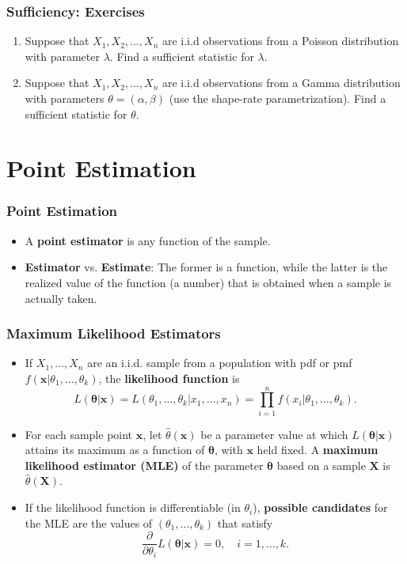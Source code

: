 \documentclass{beamer}
\begin{document}
\begin{frame}
\frametitle{Sufficiency: Exercises}
\begin{enumerate}
\item Suppose that $X_1,X_2,\ldots,X_n$ are i.i.d observations from a Poisson distribution with parameter $\lambda$. %
Find a sufficient statistic for $\lambda$.
\vspace*{0.7in}
\item Suppose that $X_1,X_2,\ldots,X_n$ are i.i.d observations from a Gamma distribution with parameters $\theta = (\alpha,\beta)$ (use the shape-rate parametrization). %
Find a sufficient statistic for $\theta$.
\end{enumerate}
\end{frame}

\section{Point Estimation}
\begin{frame}
\frametitle{Point Estimation}
\begin{itemize}
\item A \textbf{point estimator} is any function of the sample.
\item \textbf{Estimator} vs. \textbf{Estimate}: The former is a function, while the latter is the realized value of the function (a number) that is obtained when a sample is actually taken.
\end{itemize}
\end{frame}

\begin{frame}
\frametitle{Maximum Likelihood Estimators}
\begin{itemize}
\item If $X_1,\ldots,X_n$ are an i.i.d. sample from a population with pdf or pmf $f(\mathbf{x}|\theta_1,\ldots,\theta_k)$, the \textbf{likelihood function} is
$$
L(\mathbf{\theta}|\mathbf{x}) = L(\theta_1,\ldots,\theta_k|x_1,\ldots,x_n) = \prod_{i=1}^n f(x_i|\theta_1,\ldots,\theta_k).
$$
\item For each sample point $\mathbf{x}$, let $\hat{\theta}(\mathbf{x})$ be a parameter value at which $L(\mathbf{\theta}|\mathbf{x})$ attains its maximum as a function of $\mathbf{\theta}$, with $\mathbf{x}$ held fixed. A \textbf{maximum likelihood estimator (MLE)} of the parameter $\mathbf{\theta}$ based on a sample $\mathbf{X}$ is $\hat{\theta}(\mathbf{X})$.
\item If the likelihood function is differentiable (in $\theta_i$), \textbf{possible candidates} for the MLE are the values of $(\theta_1,\ldots,\theta_k)$ that satisfy
$$
\frac{\partial}{\partial \theta_i} L(\mathbf{\theta}|\mathbf{x})=0, \quad i=1,\ldots,k.
$$
\end{itemize}
\end{frame}
\end{document}
